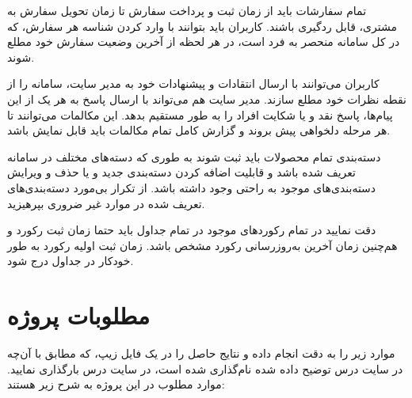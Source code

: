 \documentclass[12pt,a4paper]{article}
\begin{document}
\par
تمام سفارشات باید از زمان ثبت و پرداخت سفارش تا زمان تحویل سفارش به مشتری، قابل ردگیری باشند.
کاربران باید بتوانند با وارد کردن شناسه هر سفارش، که در کل سامانه منحصر به فرد است، در هر لحظه از آخرین وضعیت سفارش خود مطلع شوند.
\par
کاربران می‌توانند با ارسال انتقادات و پیشنهادات خود به مدیر سایت، سامانه را از نقطه نظرات خود مطلع سازند.
مدیر سایت هم می‌تواند با ارسال پاسخ به هر یک از این پیام‌ها، پاسخ نقد و یا شکایت افراد را به طور مستقیم بدهد.
این مکالمات می‌توانند تا هر مرحله‌ دلخواهی پیش بروند و گزارش کامل تمام مکالمات باید قابل نمایش باشد.
\par
دسته‌بندی تمام محصولات باید ثبت شوند به طوری که دسته‌های مختلف در سامانه تعریف شده باشد و
قابلیت اضافه کردن دسته‌بندی جدید و یا حذف و ویرایش دسته‌بندی‌های موجود به راحتی وجود داشته باشد.
از تکرار بی‌مورد دسته‌بندی‌های تعریف شده در موارد غیر ضروری بپرهیزید.
\par
دقت نمایید در تمام رکوردهای موجود در تمام جداول باید حتما زمان ثبت رکورد و هم‌چنین زمان آخرین به‌روزرسانی رکورد مشخص باشد.
زمان ثبت اولیه رکورد به طور خودکار در جداول درج شود.

\section{مطلوبات پروژه} 
موارد زیر را به دقت انجام داده و نتایج حاصل را در یک فایل زیپ، که مطابق با آن‌چه در سایت درس توضیح داده شده نام‌گذاری شده است،
در سایت درس بارگذاری نمایید. موارد مطلوب در این پروژه به شرح زیر هستند:
\end{document}
